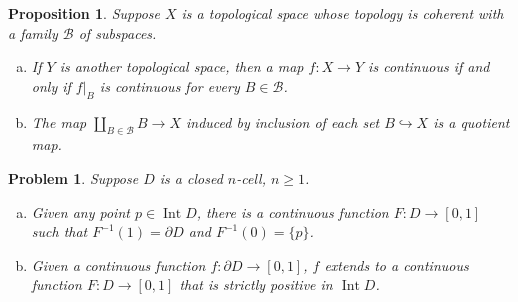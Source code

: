 \documentclass{article}
\newtheorem{problem}[theorem]{Problem}
\newtheorem{proposition}[theorem]{Proposition}
\theoremstyle{definition}
\begin{document}
\renewcommand{\thetheorem}{5.2}
\begin{proposition}
Suppose $X$ is a topological space whose topology is coherent with a family
$\mathcal{B}$ of subspaces.
\begin{enumerate}[(a)]
\item If $Y$ is another topological space, then a map $f : X \to Y$ is continuous 
if and only if $f|_B$ is continuous for every $B \in \mathcal{B}$.
\item The map $\coprod_{B \in \mathcal{B}} B \to X$ induced by inclusion of each 
set $B \hookrightarrow X$ is a quotient map.
\end{enumerate}
\end{proposition}

\renewcommand{\thetheorem}{5-2}
\begin{problem}
Suppose $D$ is a closed $n$-cell, $n \ge 1$.
\begin{enumerate}[(a)]
\item Given any point $p \in \operatorname{Int} D$, there is a continuous function
$F : D \to [0,1]$ such that $F^{-1}(1) = \partial D$ and $F^{-1}(0)=\{p\}$.
\item Given a continuous function $f : \partial D \to [0,1]$, $f$ extends to a
continuous function $F : D \to [0,1]$ that is strictly positive in 
$\operatorname{Int} D$.
\end{enumerate}
\end{problem}
\end{document}
